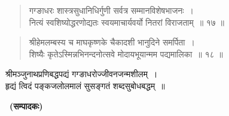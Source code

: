 \begin{verse}
गग्ङाधरः शास्त्रसुधानिधिर्गुणी सर्वत्र सम्मानविशेषभाजनः~।\\
नित्यं स्वशिष्योद्धरणोद्यतः स्वयमाचार्यवर्यो नितरां विराजताम्~॥ १७ ॥
\end{verse}

\begin{verse}
श्रीहेमलम्बस्य च माघकृष्णके चैकादशी भानुदिने समर्पिता~।\\
शिष्यैः कृतेऽस्मिन्नभिनन्दनोत्सवे मोदायभूयान्मम पद्यमालिका~॥ १८ ॥
\end{verse}


\begin{center}
श्रीमञ्जुनाथप्रणिबद्धपद्यं गग्ङाधरोज्जीवनजन्मशीलम्~।\\
हृद्यं त्विदं पङ्कजलोलमालं सुसङ्गतं शब्दसुबोधबद्धम्~॥
\end{center}

~\hfill\textbf{(सम्पादकः)}

